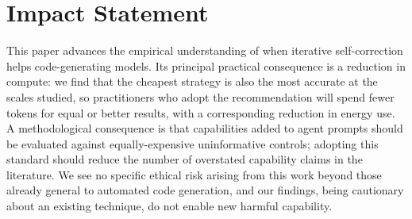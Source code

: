 \documentclass{article}
\begin{document}

\printAffiliationsAndNotice{}



\section*{Impact Statement}

This paper advances the empirical understanding of when iterative
self-correction helps code-generating models. Its principal practical
consequence is a reduction in compute: we find that the cheapest strategy is
also the most accurate at the scales studied, so practitioners who adopt the
recommendation will spend fewer tokens for equal or better results, with a
corresponding reduction in energy use. A methodological consequence is that
capabilities added to agent prompts should be evaluated against
equally-expensive uninformative controls; adopting this standard should reduce
the number of overstated capability claims in the literature. We see no
specific ethical risk arising from this work beyond those already general to
automated code generation, and our findings, being cautionary about an existing
technique, do not enable new harmful capability.



\end{document}
